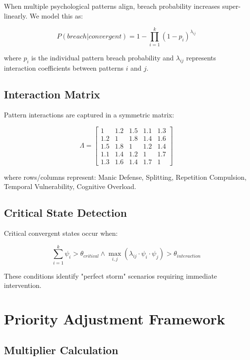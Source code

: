 \documentclass[11pt,a4paper]{article}
\begin{document}
When multiple psychological patterns align, breach probability increases super-linearly. We model this as:

\begin{equation}
P(breach|convergent) = 1 - \prod_{i=1}^{k}(1 - p_i)^{\lambda_{ij}}
\end{equation}

where $p_i$ is the individual pattern breach probability and $\lambda_{ij}$ represents interaction coefficients between patterns $i$ and $j$.

\subsection{Interaction Matrix}

Pattern interactions are captured in a symmetric matrix:

\begin{equation}
\Lambda = \begin{bmatrix}
1 & 1.2 & 1.5 & 1.1 & 1.3 \\
1.2 & 1 & 1.8 & 1.4 & 1.6 \\
1.5 & 1.8 & 1 & 1.2 & 1.4 \\
1.1 & 1.4 & 1.2 & 1 & 1.7 \\
1.3 & 1.6 & 1.4 & 1.7 & 1
\end{bmatrix}
\end{equation}

where rows/columns represent: Manic Defense, Splitting, Repetition Compulsion, Temporal Vulnerability, Cognitive Overload.

\subsection{Critical State Detection}

Critical convergent states occur when:

\begin{equation}
\sum_{i=1}^{k} \psi_i > \theta_{critical} \land \max_{i,j}(\lambda_{ij} \cdot \psi_i \cdot \psi_j) > \theta_{interaction}
\end{equation}

These conditions identify "perfect storm" scenarios requiring immediate intervention.

\section{Priority Adjustment Framework}

\subsection{Multiplier Calculation}
\end{document}
